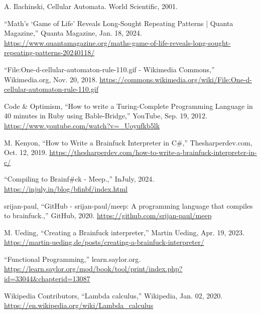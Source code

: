 \documentclass[12pt]{report} %
\begin{document}
\begin{singlespace}
\begin{thebibliography}{}
             A. Ilachinski, Cellular Automata. World Scientific, 2001.

             “Math’s ‘Game of Life’ Reveals Long-Sought Repeating Patterns | Quanta Magazine,” Quanta Magazine, Jan. 18, 2024. \href{https://www.quantamagazine.org/maths-game-of-life-reveals-long-sought-repeating-patterns-20240118/}{https://www.quantamagazine.org/maths-game-of-life-reveals-long-sought-repeating-patterns-20240118/}

             “File:One-d-cellular-automaton-rule-110.gif - Wikimedia Commons,” Wikimedia.org, Nov. 20, 2018. \href{https://commons.wikimedia.org/wiki/File:One-d-cellular-automaton-rule-110.gif}{https://commons.wikimedia.org/wiki/File:One-d-cellular-automaton-rule-110.gif}

             Code \& Optimism, “How to write a Turing-Complete Programming Language in 40 minutes in Ruby using Bable-Bridge,” YouTube, Sep. 19, 2012. \href{https://www.youtube.com/watch?v=_Uoyufkb5lk}{https://www.youtube.com/watch?v=\_Uoyufkb5lk}

             M. Kenyon, “How to Write a Brainfuck Interpreter in C\#,” Thesharperdev.com, Oct. 12, 2019. \href{https://thesharperdev.com/how-to-write-a-brainfuck-interpreter-in-c/}{https://thesharperdev.com/how-to-write-a-brainfuck-interpreter-in-c/}

             “Compiling to Brainf\#ck - Meep.,” InJuly, 2024. \href{https://injuly.in/blog/bfinbf/index.html}{https://injuly.in/blog/bfinbf/index.html}

             srijan-paul, “GitHub - srijan-paul/meep: A programming language that compiles to brainfuck.,” GitHub, 2020. \href{https://github.com/srijan-paul/meep}{https://github.com/srijan-paul/meep}

             M. Ueding, “Creating a Brainfuck interpreter,” Martin Ueding, Apr. 19, 2023. \href{https://martin-ueding.de/posts/creating-a-brainfuck-interpreter/}{https://martin-ueding.de/posts/creating-a-brainfuck-interpreter/}

             “Functional Programming,” learn.saylor.org. \href{https://learn.saylor.org/mod/book/tool/print/index.php?id=33044&chapterid=13087}{https://learn.saylor.org/mod/book/tool/print/\-index.php?id=33044\&chapterid=13087}

             Wikipedia Contributors, “Lambda calculus,” Wikipedia, Jan. 02, 2020. \href{https://en.wikipedia.org/wiki/Lambda_calculus}{https://en.wikipedia.org/wiki/Lambda\_calculus}


\end{thebibliography}
\end{singlespace}
\end{document}
